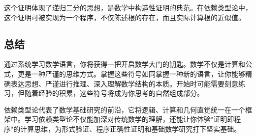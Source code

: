 \documentclass[12pt,a4paper,UTF8]{ctexart}
\begin{document}
这个证明体现了递归二分的思想，是数学中构造性证明的典范。在依赖类型论中，这个证明可被实现为一个程序，不仅陈述根的存在，而且实际计算根的近似值。

\subsection*{总结}

\qquad 通过系统学习数学语言，你将获得一把开启数学大门的钥匙。数学不仅是计算和公式，更是一种严谨的思维方式。掌握这些符号如同掌握一种新的语言，让你能够精确表达思想、严谨进行推理、深入理解数学结构的本质。开始时可能需要刻意练习，但随着经验的积累，这些符号将成为你思考的自然组成部分。

\qquad 依赖类型论代表了数学基础研究的前沿，它将逻辑、计算和几何直觉统一在一个框架中。学习依赖类型论不仅能加深对传统数学的理解，还能让你体验"证明即程序"的计算思维，为形式验证、程序正确性证明和基础数学研究打下坚实基础。
\end{document}
